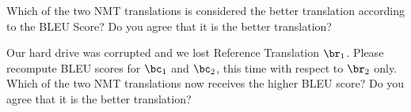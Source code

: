 \begin{parts}
\begin{subparts}
        Which of the two NMT translations is considered the better translation according to the BLEU Score? Do you agree that it is the better translation?
        
        
        \subpart[5] Our hard drive was corrupted and we lost Reference Translation $\br_1$. Please recompute BLEU scores for $\bc_1$ and $\bc_2$, this time with respect to $\br_2$ only. Which of the two NMT translations now receives the higher BLEU score? Do you agree that it is the better translation?
        

\end{subparts}
\end{parts}

